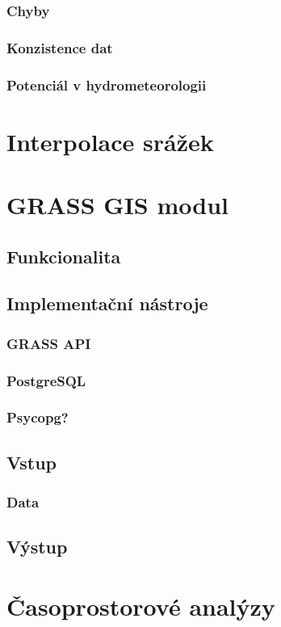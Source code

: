 \documentclass[a4paper,12pt]{article}
\begin{document}
\subsubsection{Chyby}
\subsubsection{Konzistence dat}
\subsubsection{Potenciál v hydrometeorologii}


\section{Interpolace srážek}

\section{GRASS GIS modul}
\subsection{Funkcionalita}
\subsection{Implementační nástroje}
\subsubsection{GRASS API}
\subsubsection{PostgreSQL}
\subsubsection{Psycopg?}
\subsection{Vstup}   
\subsubsection{Data}
\subsection{Výstup}


\section{Časoprostorové analýzy}
\end{document}
